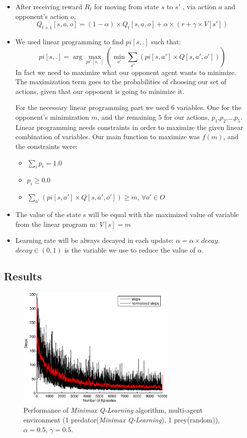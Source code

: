 \documentclass[a4paper,11pt]{article}
\begin{document}
\begin{itemize}
\item After receiving reward $R_t$ for moving from state $s$ to $s'$ , via action $a$ and opponent's action $o$,
\[
Q_{t+1}[s,a,o] = (1-\alpha)\times Q_t[s,a,o] + \alpha \times (r + \gamma \times V[s'])
\]

\item We used linear programming to find $pi[s,.]$ such that:
\[
pi[s,.] = \arg\max_{pi'[s,.]} {(\min_{o'} \sum_{a'} (pi[s,a'] \times Q[s,a',o']))}
\]
In fact we need to maximize what our opponent agent wants to minimize. The maximization term goes to the probabilities of choosing our set of actions, given that our opponent is going to minimize it. 

For the necessary linear programming part we used $6$ variables. One for the opponent's minimization $m$, and the remaining $5$ for our actions, $p_1$,$p_2$,\ldots,$p_5$. Linear programming needs constraints in order to maximize the given linear combination of variables. Our main function to maximize was $f(m)$, and the constraints were:
\begin{itemize}
\item $ \sum_{i}{p_i} = 1.0$
\item $ p_i \geq 0.0$
\item $ \sum_{a'} (pi[s,a'] \times Q[s,a',o']) \geq m$, $\forall o' \in O$
\end{itemize}
\item The value of the state s will be equal with the maximized value of variable from the linear program m: $V[s] = m$
\item Learning rate will be always decayed in each update: $\alpha = \alpha \times decay$. $decay \in (0,1)$ is the variable we use to reduce the value of $\alpha$.
\end{itemize}


\subsection{Results}

\begin{figure}[h]
\begin{center}
    \includegraphics[width=0.7\textwidth]{figures/minimax0505.eps}
    \caption{Performance of  \textit{Minimax Q-Learning} algorithm, multi-agent environment (1 predator(\textit{Minimax Q-Learning}), 1 prey(random)), $\alpha = 0.5$, $\gamma = 0.5$.}
    \label{m11}
\end{center}
\end{figure}
\end{document}
